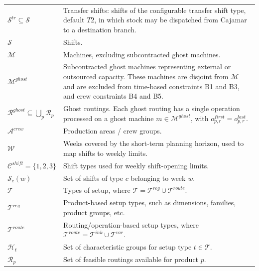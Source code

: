 \documentclass{article}
\begin{document}
\begin{longtable}{@{}L{0.32\textwidth}L{0.62\textwidth}@{}}
$\mathcal{S}^{tr} \subseteq \mathcal{S}$ & Transfer shifts: shifts of the configurable transfer shift type, default $T2$, in which stock may be dispatched from Cajamar to a destination branch. \\

$\mathcal{S}$ & Shifts. \\

$\mathcal{M}$ & Machines, excluding subcontracted ghost machines. \\

$\mathcal{M}^{ghost}$ & Subcontracted ghost machines representing external or outsourced capacity. These machines are disjoint from $\mathcal{M}$ and are excluded from time-based constraints B1 and B3, and crew constraints B4 and B5. \\

$\mathcal{R}^{ghost} \subseteq \bigcup_{p} \mathcal{R}_p$ & Ghost routings. Each ghost routing has a single operation processed on a ghost machine $m \in \mathcal{M}^{ghost}$, with $o^{first}_{p,r} = o^{last}_{p,r}$. \\

$\mathcal{A}^{crew}$ & Production areas / crew groups. \\

$\mathcal{W}$ & Weeks covered by the short-term planning horizon, used to map shifts to weekly limits. \\

$\mathcal{C}^{shift} = \{1,2,3\}$ & Shift types used for weekly shift-opening limits. \\

$\mathcal{S}_{c}(w)$ & Set of shifts of type $c$ belonging to week $w$. \\

$\mathcal{T}$ & Types of setup, where $\mathcal{T} = \mathcal{T}^{reg} \cup \mathcal{T}^{route}$. \\

$\mathcal{T}^{reg}$ & Product-based setup types, such as dimensions, families, product groups, etc. \\

$\mathcal{T}^{route}$ & Routing/operation-based setup types, where $\mathcal{T}^{route} = \mathcal{T}^{ink} \cup \mathcal{T}^{var}$. \\

$\mathcal{H}_{t}$ & Set of characteristic groups for setup type $t \in \mathcal{T}$. \\

$\mathcal{R}_p$ & Set of feasible routings available for product $p$. \\


\end{longtable}
\end{document}

